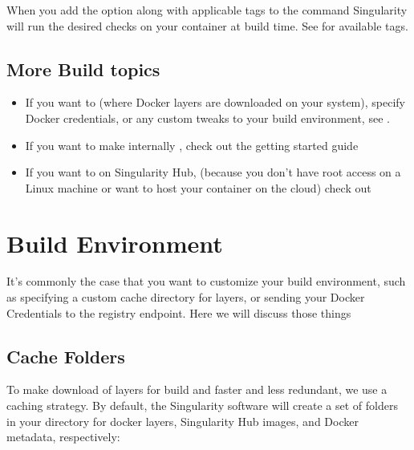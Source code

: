 \documentclass[letterpaper,10pt,english]{sphinxmanual}
\begin{document}
When you add the  option along with applicable tags to the  command
Singularity will run the desired checks on your container at build time.
See  for available tags.


\section{More Build topics}
\label{\detokenize{build_a_container:more-build-topics}}\begin{itemize}
\item {} 
If you want to  (where Docker layers
are downloaded on your system), specify Docker credentials, or any
custom tweaks to your build environment, see .

\item {} 
If you want to make internally , check out the
getting started guide 

\item {} 
If you want to  on Singularity Hub, (because
you don’t have root access on a Linux machine or want to host your
container on the cloud) check out 

\end{itemize}


\chapter{Build Environment}
\label{\detokenize{build_environment:build-environment}}\label{\detokenize{build_environment::doc}}\label{\detokenize{build_environment:sec-buildenv}}
It’s commonly the case that you want to customize your build
environment, such as specifying a custom cache directory for layers, or
sending your Docker Credentials to the registry endpoint. Here we will
discuss those things


\section{Cache Folders}
\label{\detokenize{build_environment:cache-folders}}
To make download of layers for build and  faster and less redundant, we
use a caching strategy. By default, the Singularity software will create
a set of folders in your  directory for docker layers, Singularity Hub
images, and Docker metadata, respectively:
\end{document}
